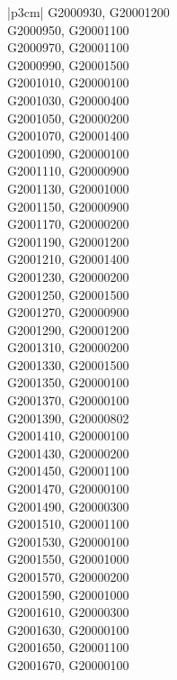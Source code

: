 \begin{customLongTable}{ |p{3cm}| }
G2000930, G20001200 \\ \hline
G2000950, G20001100 \\ \hline
G2000970, G20001100 \\ \hline
G2000990, G20001500 \\ \hline
G2001010, G20000100 \\ \hline
G2001030, G20000400 \\ \hline
G2001050, G20000200 \\ \hline
G2001070, G20001400 \\ \hline
G2001090, G20000100 \\ \hline
G2001110, G20000900 \\ \hline
G2001130, G20001000 \\ \hline
G2001150, G20000900 \\ \hline
G2001170, G20000200 \\ \hline
G2001190, G20001200 \\ \hline
G2001210, G20001400 \\ \hline
G2001230, G20000200 \\ \hline
G2001250, G20001500 \\ \hline
G2001270, G20000900 \\ \hline
G2001290, G20001200 \\ \hline
G2001310, G20000200 \\ \hline
G2001330, G20001500 \\ \hline
G2001350, G20000100 \\ \hline
G2001370, G20000100 \\ \hline
G2001390, G20000802 \\ \hline
G2001410, G20000100 \\ \hline
G2001430, G20000200 \\ \hline
G2001450, G20001100 \\ \hline
G2001470, G20000100 \\ \hline
G2001490, G20000300 \\ \hline
G2001510, G20001100 \\ \hline
G2001530, G20000100 \\ \hline
G2001550, G20001000 \\ \hline
G2001570, G20000200 \\ \hline
G2001590, G20001000 \\ \hline
G2001610, G20000300 \\ \hline
G2001630, G20000100 \\ \hline
G2001650, G20001100 \\ \hline
G2001670, G20000100 \\ \hline

\end{customLongTable}
